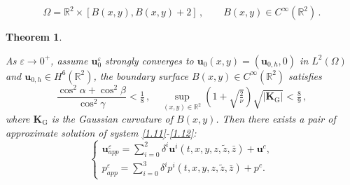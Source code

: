 \documentclass[10pt,a4paper]{amsart}
\newtheorem{theorem}{Theorem}
\begin{document}
\begin{equation}\label{1.12}
	\Omega=\mathbb{R}^2 \times [B(x, y), B(x, y) + 2]\,,\qquad  B(x,y)\in C^\infty(\mathbb{R}^2)\,.
\end{equation}

\begin{theorem}\label{thapp}

As $\varepsilon\rightarrow 0^+$, assume $\boldsymbol{u}_0^\varepsilon$ strongly converges to ${\boldsymbol{u}}_0 (x,y)= ({\boldsymbol{u}}_{0,h}, 0)$ in $L^2(\Omega)$ and ${\boldsymbol{u}}_{0,h}\in H^6(\mathbb{R}^2)$, the boundary surface $B(x,y)\in C^\infty(\mathbb{R}^2)$ satisfies 	
	\begin{equation}\label{+16}
		\frac{\cos^2\alpha+\cos^2\beta}{\cos^2\gamma}<\tfrac{1}{8}\,,
		\quad  
		\sup\limits_{(x,y)\in \mathbb{R}^2} (1+\sqrt{\tfrac{2}{\nu}})\sqrt{\big| \boldsymbol{K}_{\mathrm{G}}\big|} <\tfrac{8}{9}\,,
	\end{equation}
where   $\boldsymbol{K}_{\mathrm{G}}$ is  the Gaussian curvature of $B(x,y)$.
Then there exists a pair of approximate solution of system \eqref{1.11}-\eqref{1.12}:
	\begin{equation}\label{1.16}
		\begin{cases}
			\boldsymbol{u}_{app}^{\varepsilon}=\sum\limits_{i=0}^{2}{\delta}^i
			 \boldsymbol u^{i}(t,x,y,z,\tilde z,\bar{z}) 
			+\boldsymbol u^{c},\\
			{p}_{app}^{\varepsilon}=\sum\limits_{i=0}^{3}{\delta}^i
			  p^{i}(t,x,y,z,\tilde z,\bar{z}) 
			+p^{c}.
		\end{cases}
	\end{equation}


\end{theorem}
\end{document}
